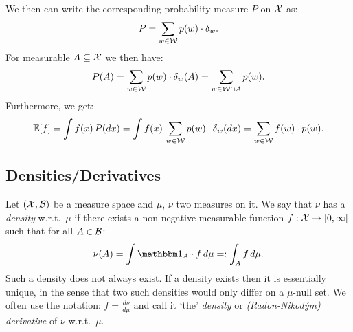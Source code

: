 \begin{Eg}
\begin{enumerate}
            We then can write the corresponding probability measure $P$ on $\mathcal{X}$ as: %
            \[  P = \sum_{w \in \mathcal{W}} p(w) \cdot \delta_{w}.\]
            For measurable $A \subseteq \mathcal{X}$ we then have:
             \[ P(A) = \sum_{w \in \mathcal{W}} p(w) \cdot \delta_{w}(A) = \sum_{w \in \mathcal{W} \cap A} p(w). \]
            Furthermore, we get:
            \[ \mathbb{E}[f] = \int f(x)\, P(dx) = \int f(x)\,\sum_{w \in \mathcal{W}} p(w) \cdot \delta_{w}(dx) = \sum_{w \in \mathcal{W}} f(w) \cdot p(w). \]
    \end{enumerate}
\end{Eg}






\subsection{Densities/Derivatives}

\begin{Def}
    Let $(\mathcal{X},\mathcal{B})$ be a measure space and $\mu$, $\nu$ two measures on it.
    We say that $\nu$ has a \emph{density} w.r.t.\ $\mu$ if there exists a non-negative measurable function $f: \mathcal{X} \to [0,\infty]$ such that for all $A \in \mathcal{B}$:
    \[ \nu(A) = \int \I_A\cdot f \, d\mu =:\int_A f \, d\mu  .\]
    Such a density does not always exist.
    If a density exists then it is essentially unique, in the sense that two such densities would only differ on a $\mu$-null set.
    We often use the notation: $f=\frac{d\nu}{d\mu}$ and call it `the' \emph{density} or \emph{(Radon-Nikod\'ym) derivative} of $\nu$ w.r.t.\ $\mu$.
\end{Def}

